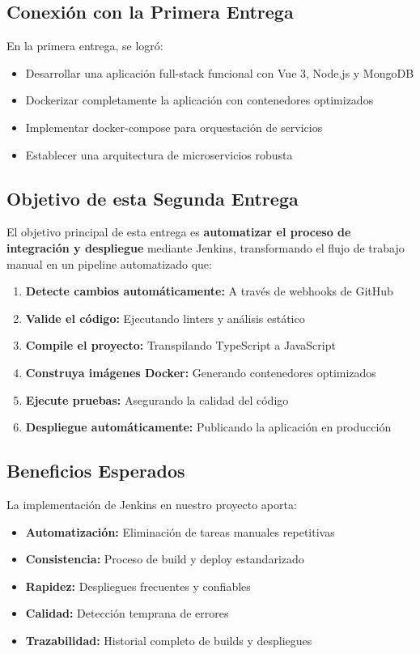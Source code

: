 \documentclass[12pt,a4paper]{article}
\begin{document}
\subsection{Conexión con la Primera Entrega}

En la primera entrega, se logró:
\begin{itemize}
    \item Desarrollar una aplicación full-stack funcional con Vue 3, Node.js y MongoDB
    \item Dockerizar completamente la aplicación con contenedores optimizados
    \item Implementar docker-compose para orquestación de servicios
    \item Establecer una arquitectura de microservicios robusta
\end{itemize}

\subsection{Objetivo de esta Segunda Entrega}

El objetivo principal de esta entrega es \textbf{automatizar el proceso de integración y despliegue} mediante Jenkins, transformando el flujo de trabajo manual en un pipeline automatizado que:

\begin{enumerate}
    \item \textbf{Detecte cambios automáticamente:} A través de webhooks de GitHub
    \item \textbf{Valide el código:} Ejecutando linters y análisis estático
    \item \textbf{Compile el proyecto:} Transpilando TypeScript a JavaScript
    \item \textbf{Construya imágenes Docker:} Generando contenedores optimizados
    \item \textbf{Ejecute pruebas:} Asegurando la calidad del código
    \item \textbf{Despliegue automáticamente:} Publicando la aplicación en producción
\end{enumerate}

\subsection{Beneficios Esperados}

La implementación de Jenkins en nuestro proyecto aporta:

\begin{itemize}
    \item \textbf{Automatización:} Eliminación de tareas manuales repetitivas
    \item \textbf{Consistencia:} Proceso de build y deploy estandarizado
    \item \textbf{Rapidez:} Despliegues frecuentes y confiables
    \item \textbf{Calidad:} Detección temprana de errores
    \item \textbf{Trazabilidad:} Historial completo de builds y despliegues
\end{itemize}
\end{document}
